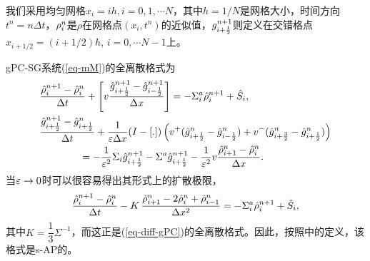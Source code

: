我们采用均匀网格$x_i = ih, i = 0, 1, \cdots N$，其中$h = 1 / N$是网格大小，时间方向$t^n = n \Delta t$，$\rho^n_{i}$是$\rho$在网格点$(x_i, t ^ n)$的近似值，$g^{n+1}_{i+\frac{1}{2}}$则定义在交错格点$x_{i + 1/2} =(i + 1/2)h$, $i = 0, \cdots N-1$上。


gPC-SG系统(\ref{eq-mM})的全离散格式为
\begin{subequations} \label{eq-scheme}
\begin{align}
& \frac{\hat{\rho}^{n+1}_{i}-\hat{\rho}^n_{i}}{\Delta t} +
\left[ v\frac{\hat{g}^{n+1}_{i+\frac{1}{2}}-\hat{g}^{n+1}_{i-\frac{1}{2}}}{\Delta x} \right] = -\Sigma^a_i \hat \rho^{n+1}_i + \hat S_i,
 \label{eq-schrho}  \\
& \frac{\hat{g}^{n+1}_{i+\frac{1}{2}}-\hat{g}^n_{i+\frac{1}{2}}}{\Delta t} + \frac{1}{\varepsilon\Delta x} (I-\left[ . \right])
\left(v^+(\hat{g}^n_{i+\frac{1}{2}}-\hat{g}^n_{i-\frac{1}{2}})+v^-(\hat{g}^n_{i+\frac{3}{2}}-\hat{g}^n_{i+\frac{1}{2}})\right)
\label{eq-schg}  \\
& \qquad\qquad =
- \frac{1}{\varepsilon^2}\Sigma_i \hat{g}^{n+1}_{i+\frac{1}{2}}  - \Sigma^a \hat{g}^{n+1}_{i+\frac{1}{2}} -
\frac{1}{\varepsilon^2}v\frac{\hat{\rho}^n_{i+1}-\hat{\rho}^n_{i}}{\Delta x}. \nonumber
\end{align}
\end{subequations}
当$\varepsilon \rightarrow 0$时可以很容易得出其形式上的扩散极限，
\begin{equation}  \label{eq-sdiff}
\frac{\hat{\rho}^{n+1}_{i}-\hat{\rho}^n_{i}}{\Delta t} -
K \, \frac{\hat{\rho}^n_{i+1}-2\hat{\rho}^n_{i}+\hat{\rho}^n_{i-1}}{\Delta x^2}= -\Sigma^a_i \hat \rho^{n+1}_i + \hat S_i,
\end{equation}
其中$K = \dfrac{1}{3}\Sigma^{-1}$，而这正是(\ref{eq-diff-gPC})的全离散格式。因此，按照中的定义，该格式是s-AP的。

